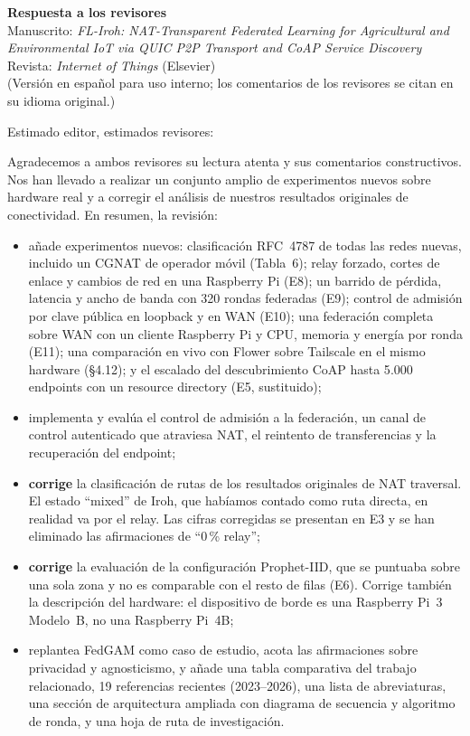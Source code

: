 \documentclass[11pt,a4paper]{article}
\begin{document}
\begin{center}
{\Large\bfseries Respuesta a los revisores}\\[0.4em]
Manuscrito: \emph{FL-Iroh: NAT-Transparent Federated Learning for Agricultural and Environmental IoT via QUIC P2P Transport and CoAP Service Discovery}\\
Revista: \emph{Internet of Things} (Elsevier)\\[0.3em]
{\small (Versión en español para uso interno; los comentarios de los revisores se citan en su idioma original.)}
\end{center}

Estimado editor, estimados revisores:

Agradecemos a ambos revisores su lectura atenta y sus comentarios constructivos. Nos han llevado a realizar un conjunto amplio de experimentos nuevos sobre hardware real y a corregir el análisis de nuestros resultados originales de conectividad. En resumen, la revisión:

\begin{itemize}[leftmargin=1.3em,itemsep=0.15em]
\item añade experimentos nuevos: clasificación RFC~4787 de todas las redes nuevas, incluido un CGNAT de operador móvil (Tabla~6); relay forzado, cortes de enlace y cambios de red en una Raspberry Pi (E8); un barrido de pérdida, latencia y ancho de banda con 320 rondas federadas (E9); control de admisión por clave pública en loopback y en WAN (E10); una federación completa sobre WAN con un cliente Raspberry Pi y CPU, memoria y energía por ronda (E11); una comparación en vivo con Flower sobre Tailscale en el mismo hardware (\S4.12); y el escalado del descubrimiento CoAP hasta 5{.}000 endpoints con un resource directory (E5, sustituido);
\item implementa y evalúa el control de admisión a la federación, un canal de control autenticado que atraviesa NAT, el reintento de transferencias y la recuperación del endpoint;
\item \textbf{corrige} la clasificación de rutas de los resultados originales de NAT traversal. El estado ``mixed'' de Iroh, que habíamos contado como ruta directa, en realidad va por el relay. Las cifras corregidas se presentan en E3 y se han eliminado las afirmaciones de ``0\,\% relay'';
\item \textbf{corrige} la evaluación de la configuración Prophet-IID, que se puntuaba sobre una sola zona y no es comparable con el resto de filas (E6). Corrige también la descripción del hardware: el dispositivo de borde es una Raspberry Pi~3 Modelo~B, no una Raspberry Pi~4B;
\item replantea FedGAM como caso de estudio, acota las afirmaciones sobre privacidad y agnosticismo, y añade una tabla comparativa del trabajo relacionado, 19 referencias recientes (2023--2026), una lista de abreviaturas, una sección de arquitectura ampliada con diagrama de secuencia y algoritmo de ronda, y una hoja de ruta de investigación.
\end{itemize}
\end{document}
